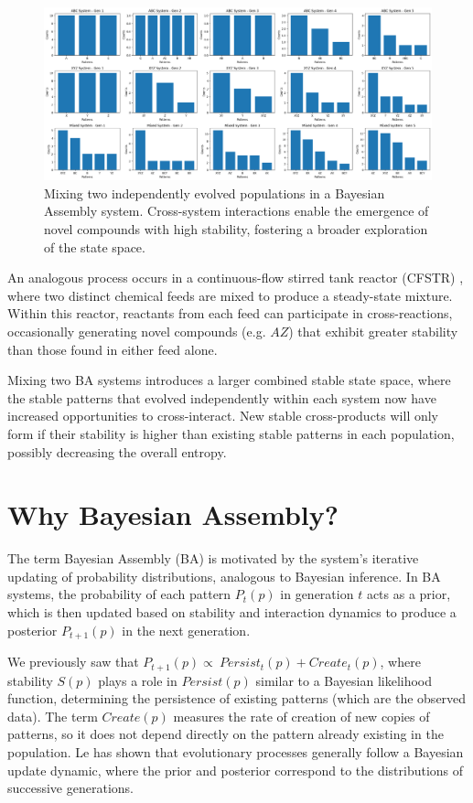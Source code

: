 \documentclass[preprint,12pt]{elsarticle}
\begin{document}
\begin{figure}[htp]
    \centering
    \includegraphics[width=13cm]{figure_3}
    \caption{Mixing two independently evolved populations in a Bayesian Assembly system. Cross-system interactions enable the emergence of novel compounds with high stability, fostering a broader exploration of the state space.}
    \label{fig:figure_3}
\end{figure}

An analogous process occurs in a continuous-flow stirred tank reactor (CFSTR) \cite{fogler1999chemical}, where two distinct chemical feeds are mixed to produce a steady-state mixture. Within this reactor, reactants from each feed can participate in cross-reactions, occasionally generating novel compounds (e.g. \( AZ \)) that exhibit greater stability than those found in either feed alone. 

Mixing two BA systems introduces a larger combined stable state space, where the stable patterns that evolved independently within each system now have increased opportunities to cross-interact. New stable cross-products will only form if their stability is higher than existing stable patterns in each population, possibly decreasing the overall entropy.

\section{Why Bayesian Assembly?}

The term Bayesian Assembly (BA) is motivated by the system's iterative updating of probability distributions, analogous to Bayesian inference. In BA systems, the probability of each pattern \( P_t(p) \) in generation \( t \) acts as a prior, which is then updated based on stability and interaction dynamics to produce a posterior \( P_{t+1}(p) \) in the next generation. 

We previously saw that $P_{t+1}(p) \propto\ Persist_t(p) + Create_t(p)$, where stability \( S(p) \) plays a role in $Persist(p)$ similar to a Bayesian likelihood function, determining the persistence of existing patterns (which are the observed data). The term $Create(p)$ measures the rate of creation of new copies of patterns, so it does not depend directly on the pattern already existing in the population. Le \cite{le2020equation} has shown that evolutionary processes generally follow a Bayesian update dynamic, where the prior and posterior correspond to the distributions of successive generations. 
\end{document}
